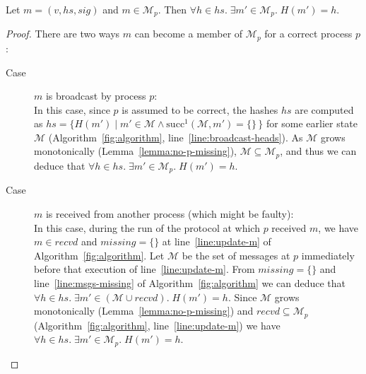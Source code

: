 \documentclass[a4paper,anonymous,USenglish]{lipics-v2019}
\begin{document}
\begin{lemma}\label{lemma:no-dangling}
Let $m = (v, \mathit{hs}, \mathit{sig})$ and $m \in \mathcal{M}_p$.
Then $\forall h \in \mathit{hs}.\; \exists m' \in \mathcal{M}_p.\; H(m') = h$.
\end{lemma}
\begin{proof}
There are two ways $m$ can become a member of $\mathcal{M}_p$ for a correct process $p$:
\begin{description}
    \item[Case] $m$ is broadcast by process $p$:\\
    In this case, since $p$ is assumed to be correct, the hashes $\mathit{hs}$ are computed as $\mathit{hs} = \{H(m') \mid m' \in \mathcal{M} \wedge \mathrm{succ}^1(\mathcal{M}, m') = \{\}\,\}$ for some earlier state $\mathcal{M}$ (Algorithm~\ref{fig:algorithm}, line~\ref{line:broadcast-heads}).
    As $\mathcal{M}$ grows monotonically (Lemma~\ref{lemma:no-p-missing}), $\mathcal{M} \subseteq \mathcal{M}_p$, and thus we can deduce that $\forall h \in \mathit{hs}.\; \exists m' \in \mathcal{M}_p.\; H(m') = h$.
    \item[Case] $m$ is received from another process (which might be faulty):\\
    In this case, during the run of the protocol at which $p$ received $m$, we have $m \in \mathit{recvd}$ and $\mathit{missing} = \{\}$ at line~\ref{line:update-m} of Algorithm~\ref{fig:algorithm}.
    Let $\mathcal{M}$ be the set of messages at $p$ immediately before that execution of line~\ref{line:update-m}.
    From $\mathit{missing} = \{\}$ and line~\ref{line:msgs-missing} of Algorithm~\ref{fig:algorithm} we can deduce that $\forall h \in \mathit{hs}.\; \exists m' \in (\mathcal{M} \cup \mathit{recvd}).\; H(m') = h$.
    Since $\mathcal{M}$ grows monotonically (Lemma~\ref{lemma:no-p-missing}) and $\mathit{recvd} \subseteq \mathcal{M}_p$ (Algorithm~\ref{fig:algorithm}, line~\ref{line:update-m}) we have $\forall h \in \mathit{hs}.\; \exists m' \in \mathcal{M}_p.\; H(m') = h$.
\end{description}
\end{proof}
\end{document}
